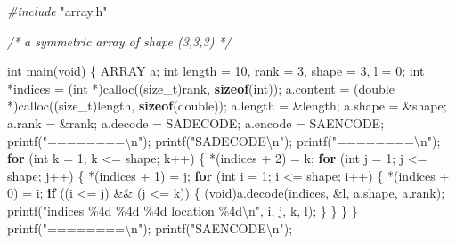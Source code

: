 \documentclass[
  12pt,
]{article}
\newenvironment{Shaded}{\begin{snugshade}}{\end{snugshade}}
\newcommand{\CommentTok}[1]{\textcolor[rgb]{0.56,0.35,0.01}{\textit{#1}}}
\newcommand{\ControlFlowTok}[1]{\textcolor[rgb]{0.13,0.29,0.53}{\textbf{#1}}}
\newcommand{\DataTypeTok}[1]{\textcolor[rgb]{0.13,0.29,0.53}{#1}}
\newcommand{\DecValTok}[1]{\textcolor[rgb]{0.00,0.00,0.81}{#1}}
\newcommand{\ImportTok}[1]{#1}
\newcommand{\KeywordTok}[1]{\textcolor[rgb]{0.13,0.29,0.53}{\textbf{#1}}}
\newcommand{\NormalTok}[1]{#1}
\newcommand{\PreprocessorTok}[1]{\textcolor[rgb]{0.56,0.35,0.01}{\textit{#1}}}
\newcommand{\SpecialCharTok}[1]{\textcolor[rgb]{0.00,0.00,0.00}{#1}}
\newcommand{\StringTok}[1]{\textcolor[rgb]{0.31,0.60,0.02}{#1}}
\begin{document}
\begin{Shaded}
\begin{Highlighting}[]
\PreprocessorTok{\#include }\ImportTok{"array.h"}

\CommentTok{/*}
\CommentTok{  a symmetric array of shape (3,3,3)}
\CommentTok{*/}

\DataTypeTok{int}\NormalTok{ main(}\DataTypeTok{void}\NormalTok{) \{}
\NormalTok{  ARRAY a;}
  \DataTypeTok{int}\NormalTok{ length = }\DecValTok{10}\NormalTok{, rank = }\DecValTok{3}\NormalTok{, shape = }\DecValTok{3}\NormalTok{, l = }\DecValTok{0}\NormalTok{;}
  \DataTypeTok{int}\NormalTok{ *indices = (}\DataTypeTok{int}\NormalTok{ *)calloc((}\DataTypeTok{size\_t}\NormalTok{)rank, }\KeywordTok{sizeof}\NormalTok{(}\DataTypeTok{int}\NormalTok{));}
\NormalTok{  a.content = (}\DataTypeTok{double}\NormalTok{ *)calloc((}\DataTypeTok{size\_t}\NormalTok{)length, }\KeywordTok{sizeof}\NormalTok{(}\DataTypeTok{double}\NormalTok{));}
\NormalTok{  a.length = \&length;}
\NormalTok{  a.shape = \&shape;}
\NormalTok{  a.rank = \&rank;}
\NormalTok{  a.decode = SADECODE;}
\NormalTok{  a.encode = SAENCODE;}
\NormalTok{  printf(}\StringTok{"========}\SpecialCharTok{\textbackslash{}n}\StringTok{"}\NormalTok{);}
\NormalTok{  printf(}\StringTok{"SADECODE}\SpecialCharTok{\textbackslash{}n}\StringTok{"}\NormalTok{);}
\NormalTok{  printf(}\StringTok{"========}\SpecialCharTok{\textbackslash{}n}\StringTok{"}\NormalTok{);}
  \ControlFlowTok{for}\NormalTok{ (}\DataTypeTok{int}\NormalTok{ k = }\DecValTok{1}\NormalTok{; k \textless{}= shape; k++) \{}
\NormalTok{    *(indices + }\DecValTok{2}\NormalTok{) = k;}
    \ControlFlowTok{for}\NormalTok{ (}\DataTypeTok{int}\NormalTok{ j = }\DecValTok{1}\NormalTok{; j \textless{}= shape; j++) \{}
\NormalTok{      *(indices + }\DecValTok{1}\NormalTok{) = j;}
      \ControlFlowTok{for}\NormalTok{ (}\DataTypeTok{int}\NormalTok{ i = }\DecValTok{1}\NormalTok{; i \textless{}= shape; i++) \{}
\NormalTok{        *(indices + }\DecValTok{0}\NormalTok{) = i;}
        \ControlFlowTok{if}\NormalTok{ ((i \textless{}= j) \&\& (j \textless{}= k)) \{}
\NormalTok{          (}\DataTypeTok{void}\NormalTok{)a.decode(indices, \&l, a.shape, a.rank);}
\NormalTok{          printf(}\StringTok{"indices \%4d \%4d \%4d location \%4d}\SpecialCharTok{\textbackslash{}n}\StringTok{"}\NormalTok{, i, j, k, l);}
\NormalTok{        \}}
\NormalTok{      \}}
\NormalTok{    \}}
\NormalTok{  \}}
\NormalTok{  printf(}\StringTok{"========}\SpecialCharTok{\textbackslash{}n}\StringTok{"}\NormalTok{);}
\NormalTok{  printf(}\StringTok{"SAENCODE}\SpecialCharTok{\textbackslash{}n}\StringTok{"}\NormalTok{);}

\end{Highlighting}
\end{Shaded}
\end{document}
